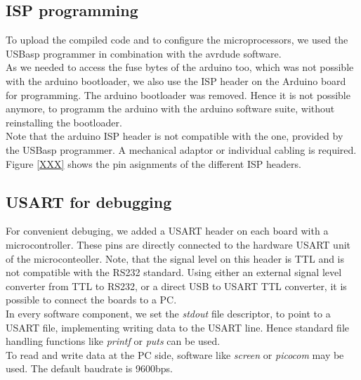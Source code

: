 \documentclass[a4paper]{scrreprt}
\begin{document}
\subsection{ISP programming}
To upload the compiled code and to configure the microprocessors, we used the USBasp programmer in combination with the avrdude software.\\
As we needed to access the fuse bytes of the arduino too, which was not possible with the arduino bootloader, we also use the ISP header on the Arduino board for programming. The arduino bootloader was removed. Hence it is not possible anymore, to programm the arduino with the arduino software suite, without reinstalling the bootloader.\\
Note that the arduino ISP header is not compatible with the one, provided by the USBasp programmer. A mechanical adaptor or individual cabling is required. Figure \ref{XXX} shows the pin asignments of the different ISP headers.
\subsection{USART for debugging}
For convenient debuging, we added a USART header on each board with a microcontroller. These pins are directly connected to the hardware USART unit of the
microconteoller. Note, that the signal level on this header is TTL and is not compatible with the RS232 standard. Using either an external signal level converter from TTL to RS232, or a direct USB to USART TTL converter, it is possible to connect the boards to a PC.\\
In every software component, we set the \emph{stdout} file descriptor, to point to a USART file, implementing writing data to the USART line.
Hence standard file handling functions like \emph{printf} or \emph{puts} can be used.\\
To read and write data at the PC side, software like \emph{screen} or \emph{picocom} may be used. The default baudrate is 9600bps.
\end{document}
